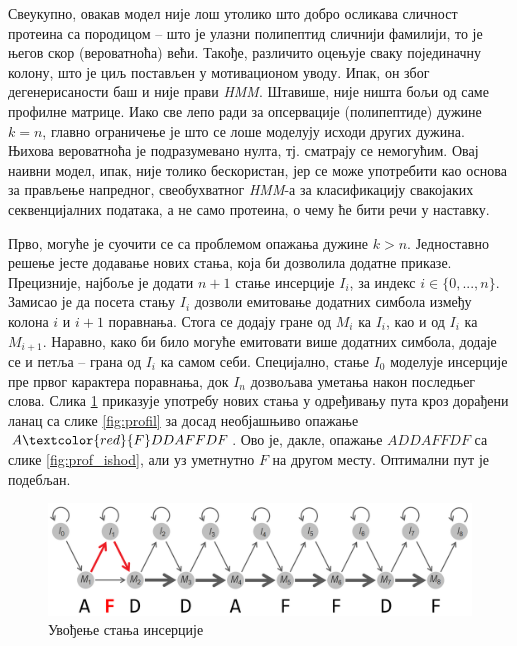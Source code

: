 \documentclass[12pt,oneside]{memoir}
\begin{document}
\begin{CJK}{UTF8}{ipxm}
Свеукупно, овакав модел није лош утолико што добро осликава сличност протеина са породицом -- што је улазни полипептид сличнији фамилији, то је његов скор (вероватноћа) већи. Такође, различито оцењује сваку појединачну колону, што је циљ постављен у мотивационом уводу. Ипак, он због дегенерисаности баш и није прави \textit{HMM}. Штавише, није ништа бољи од саме профилне матрице. Иако све лепо ради за опсервације (полипептиде) дужине $k = n$, главно ограничење је што се лоше моделују исходи других дужина. Њихова вероватноћа је подразумевано нулта, тј. сматрају се немогућим. Овај наивни модел, ипак, није толико бескористан, јер се може употребити као основа за прављење напредног, свеобухватног \textit{HMM}-а за класификацију свакојаких секвенцијалних података, а не само протеина, о чему ће бити речи у наставку.

Прво, могуће је суочити се са проблемом опажања дужине $k > n$. Једноставно решење јесте додавање нових стања, која би дозволила додатне приказе. Прецизније, најбоље је додати $n+1$ стање инсерције $I_i$, за индекс $i \in \{0, ..., n\}$. Замисао је да посета стању $I_i$ дозволи емитовање додатних симбола између колона $i$ и $i+1$ поравнања. Стога се додају гране од $M_i$ ка $I_i$, као и од $I_i$ ка $M_{i+1}$. Наравно, како би било могуће емитовати више додатних симбола, додаје се и петља -- грана од $I_i$ ка самом себи. Специјално, стање $I_0$ моделује инсерције пре првог карактера поравнања, док $I_n$ дозвољава уметања након последњег слова. Слика \ref{fig:insercije} приказује употребу нових стања у одређивању пута кроз дорађени ланац са слике \ref{fig:profil} за досад необјашњиво опажање $A\textcolor{red}{F}DDAFFDF$. Ово је, дакле, опажање $ADDAFFDF$ са слике \ref{fig:prof_ishod}, али уз уметнутно $F$ на другом месту. Оптимални пут је подебљан.

\begin{figure}[H]
  \centering
  \includegraphics[width=\textwidth]{insercije.png}
  \caption{Увођење стања инсерције\cite{compeau2015}}
  \label{fig:insercije}
\end{figure}


\end{CJK}
\end{document}
